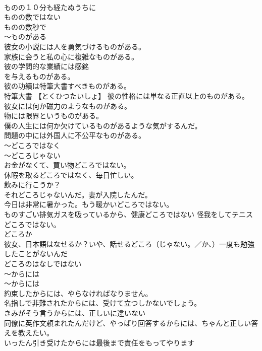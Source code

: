 \documentclass[8pt]{extreport}
\begin{document}
\begin{CJK}{UTF8}{min}
\\	ものの１０分も経たぬうちに 
\\	ものの数ではない 
\\	ものの数秒で 
\\	～ものがある	
\\	彼女の小説には人を勇気づけるものがある。 
\\	家族に会うと私の心に複雑なものがある。 
\\	彼の学問的な業績には感銘
\\	を与えるものがある。 
\\	彼の功績は特筆大書すべきものがある。 
\\	特筆大書 【とくひつたいしょ】 彼の性格には単なる正直以上のものがある。 
\\	彼女には何か磁力のようなものがある。
\\	物には限界というものがある。 
\\	僕の人生には何か欠けているものがあるような気がするんだ。 
\\	問題の中には外国人に不公平なものがある。 
\\	～どころではなく 
\\	～どころじゃない	
\\	お金がなくて、買い物どころではない。
\\	休暇を取るどころではなく、毎日忙しい。
\\	飲みに行こうか？
\\	それどころじゃないんだ。妻が入院したんだ。
\\	今日は非常に暑かった。もう暖かいどころではない。
\\	ものすごい排気ガスを吸っているから、健康どころではない 怪我をしてテニスどころではない。
\\	どころか 
\\	彼女、日本語はなせるか？いや、話せるどころ（じゃない。／か、）一度も勉強したことがないんだ 
\\	どころのはなしではない
\\	～からには 
\\	～からには 
\\	約束したからには、やらなければなりません。
\\	名指しで非難されたからには、受けて立つしかないでしょう。 
\\	きみがそう言うからには、正しいに違いない 
\\	同僚に英作文頼まれたんだけど、やっぱり回答するからには、ちゃんと正しい答えを教えたい。 
\\	いったん引き受けたからには最後まで責任をもってやります 

\end{CJK}
\end{document}
